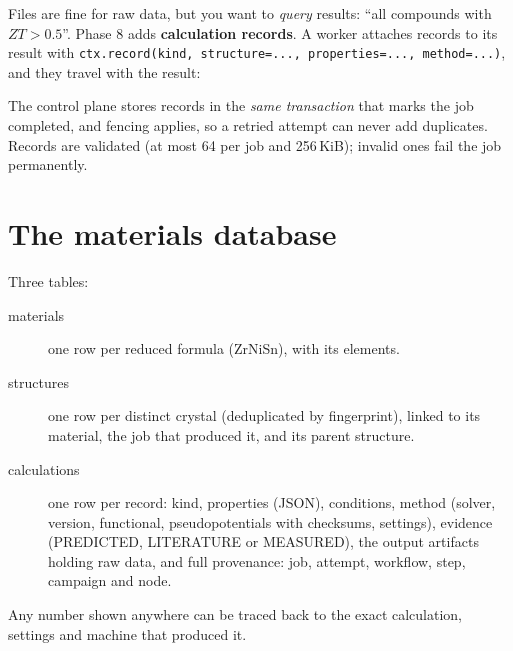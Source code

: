 \documentclass[11pt,a4paper]{report}
\newcommand{\code}[1]{\texttt{#1}}
\begin{document}
Files are fine for raw data, but you want to \emph{query} results: ``all compounds with
$ZT>0.5$''. Phase 8 adds \textbf{calculation records}. A worker attaches records to its result with
\code{ctx.record(kind, structure=..., properties=..., method=...)}, and they travel with the result:

\begin{center}
\end{center}

The control plane stores records in the \emph{same transaction} that marks the job completed, and
fencing applies, so a retried attempt can never add duplicates. Records are validated (at most 64
per job and 256\,KiB); invalid ones fail the job permanently.

\section{The materials database}

Three tables:
\begin{description}
\item[materials] one row per reduced formula (ZrNiSn), with its elements.
\item[structures] one row per distinct crystal (deduplicated by fingerprint), linked to its
  material, the job that produced it, and its parent structure.
\item[calculations] one row per record: kind, properties (JSON), conditions, method (solver,
  version, functional, pseudopotentials with checksums, settings), evidence (PREDICTED,
  LITERATURE or MEASURED), the output artifacts holding raw data, and full provenance: job,
  attempt, workflow, step, campaign and node.
\end{description}
Any number shown anywhere can be traced back to the exact calculation, settings and machine
that produced it.
\end{document}
